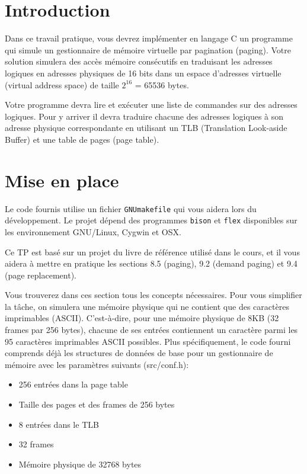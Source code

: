 \documentclass{article}
\begin{document}
\newpage
\section{Introduction}

Dans ce travail pratique, vous devrez implémenter en langage C un programme
qui simule un gestionnaire de mémoire virtuelle par pagination (paging).
Votre solution simulera des accès mémoire consécutifs en traduisant les
adresses logiques en adresses physiques de 16 bits dans un espace d'adresses
virtuelle (virtual address space) de taille $2^{16}$ = 65536 bytes.

Votre programme devra lire et exécuter une liste de commandes sur des adresses
logiques.  Pour y arriver il devra traduire chacune des adresses logiques à son
adresse physique correspondante en utilisant un TLB (Translation Look-aside
Buffer) et une table de pages (page table).

\section{Mise en place}

Le code fournis utilise un fichier \texttt{GNUmakefile} qui vous aidera lors
du développement.  Le projet dépend des programmes \texttt{bison} et
\texttt{flex} disponibles sur les environnement GNU/Linux, Cygwin et OSX.

Ce TP est basé sur un projet du livre de référence utilisé dans le cours, et
il vous aidera à mettre en pratique les sections 8.5 (paging), 9.2 (demand
paging) et 9.4 (page replacement).

Vous trouverez dans ces section tous les concepts nécessaires.  Pour vous
simplifier la tâche, on simulera une mémoire physique qui ne contient que
des caractères imprimables (ASCII).  C'est-à-dire, pour une mémoire physique
de 8KB (32 frames par 256 bytes), chacune de ses entrées contiennent un
caractère parmi les 95 caractères imprimables ASCII possibles.
Plus spécifiquement, le code fourni comprends déjà les structures de données
de base pour un gestionnaire de mémoire avec les paramètres suivants
(src/conf.h):

\begin{itemize}
\item 256 entrées dans la page table
\item Taille des pages et des frames de 256 bytes
\item 8 entrées dans le TLB
\item 32 frames
\item Mémoire physique de 32768 bytes
\end{itemize}
\end{document}
